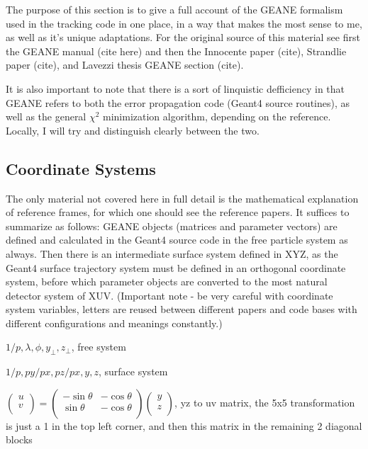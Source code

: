 \documentclass{article}
\begin{document}

The purpose of this section is to give a full account of the GEANE formalism used in the tracking code in one place, in a way that makes the most sense to me, as well as it's unique adaptations. For the original source of this material see first the GEANE manual (cite here) and then the Innocente paper (cite), Strandlie paper (cite), and Lavezzi thesis GEANE section (cite). 

It is also important to note that there is a sort of linquistic defficiency in that GEANE refers to both the error propagation code (Geant4 source routines), as well as the general $\chi^{2}$ minimization algorithm, depending on the reference. Locally, I will try and distinguish clearly between the two.


\subsection{Coordinate Systems}

The only material not covered here in full detail is the mathematical explanation of reference frames, for which one should see the reference papers. It suffices to summarize as follows: GEANE objects (matrices and parameter vectors) are defined and calculated in the Geant4 source code in the free particle system as always. Then there is an intermediate surface system defined in XYZ, as the Geant4 surface trajectory system must be defined in an orthogonal coordinate system, before which parameter objects are converted to the most natural detector system of XUV. (Important note - be very careful with coordinate system variables, letters are reused between different papers and code bases with different configurations and meanings constantly.)

$1/p, \lambda, \phi, y_{\perp}, z_{\perp}$, free system

$1/p, py/px, pz/px, y, z$, surface system

$
\begin{pmatrix}
u \\
v \\
\end{pmatrix} =
\begin{pmatrix}
-\sin{\theta} & -\cos{\theta} \\
\sin{\theta} & -\cos{\theta}\\
\end{pmatrix}
\begin{pmatrix}
y \\
z \\
\end{pmatrix}
$, yz to uv matrix, the 5x5 transformation is just a 1 in the top left corner, and then this matrix in the remaining 2 diagonal blocks
\end{document}
